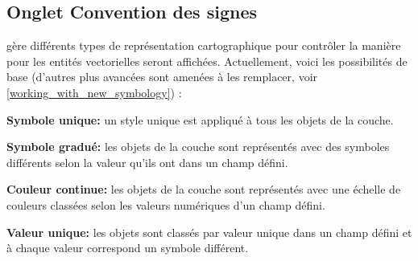 \subsection{Onglet Convention des signes}\label{sec:symbology}

\qg gère différents types de représentation cartographique pour contrôler la 
manière pour les entités vectorielles seront affichées. Actuellement, voici 
les possibilités de base (d'autres plus avancées sont amenées à les remplacer, 
voir \ref{working_with_new_symbology}) :

\begin{description}
\item \textbf{Symbole unique:}   un style unique est appliqué à tous les objets 
de la couche.
\item \textbf{Symbole gradué:}  les objets de la couche sont représentés avec 
des symboles différents selon la valeur qu'ils ont dans un champ défini.
\item \textbf{Couleur continue:} les objets de la couche sont représentés avec 
une échelle de couleurs classées selon les valeurs numériques d'un champ défini.
\item \textbf{Valeur unique:}  les objets sont classés par valeur unique dans 
un champ défini et à chaque valeur correspond un symbole différent.
\end{description}

